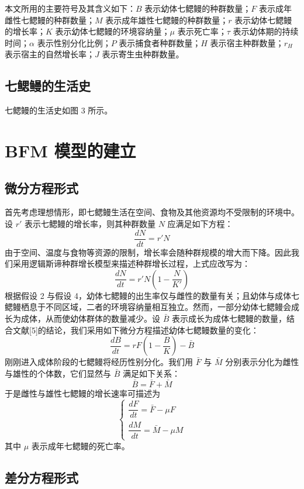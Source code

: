\documentclass[11pt,a4paper]{ctexart}
\begin{document}
本文所用的主要符号及其含义如下：$B$ 表示幼体七鳃鳗的种群数量；$F$ 表示成年雌性七鳃鳗的种群数量；$M$ 表示成年雄性七鳃鳗的种群数量；$r$ 表示幼体七鳃鳗的增长率；$K$ 表示幼体七鳃鳗的环境容纳量；$\mu$ 表示死亡率；$\tau$ 表示幼体期的持续时间；$\alpha$ 表示性别分化比例；$P$ 表示捕食者种群数量；$H$ 表示宿主种群数量；$r_H$ 表示宿主的自然增长率；$J$ 表示寄生虫种群数量。

\subsection{七鳃鳗的生活史}

七鳃鳗的生活史如图 3 所示。

\section{BFM 模型的建立}

\subsection{微分方程形式}

首先考虑理想情形，即七鳃鳗生活在空间、食物及其他资源均不受限制的环境中。设 $r'$ 表示七鳃鳗的增长率，则其种群数量 $N$ 应满足如下方程：
\[
\frac{dN}{dt}=r'N
\]
由于空间、温度与食物等资源的限制，增长率会随种群规模的增大而下降。因此我们采用逻辑斯谛种群增长模型来描述种群增长过程，上式应改写为：
\[
\frac{dN}{dt}=r'N\left(1-\frac{N}{K'}\right)
\]
根据假设 2 与假设 4，幼体七鳃鳗的出生率仅与雌性的数量有关；且幼体与成体七鳃鳗栖息于不同区域，二者的环境容纳量相互独立。然而，一部分幼体七鳃鳗会成长为成体，从而使幼体群体的数量减少。设 $\bar B$ 表示成长为成体七鳃鳗的数量，结合文献[5]的结论，我们采用如下微分方程描述幼体七鳃鳗数量的变化：
\[
\frac{dB}{dt}=rF\left(1-\frac{B}{K}\right)-\bar B
\]
刚刚进入成体阶段的七鳃鳗将经历性别分化。我们用 $\bar F$ 与 $\bar M$ 分别表示分化为雌性与雄性的个体数，它们显然与 $\bar B$ 满足如下关系：
\begin{equation}
\bar B=\bar F+\bar M \tag{1}
\end{equation}
于是雌性与雄性七鳃鳗的增长速率可描述为
\[
\begin{cases}
\dfrac{dF}{dt}=\bar F-\mu F\\[0.5em]
\dfrac{dM}{dt}=\bar M-\mu M
\end{cases}
\]
其中 $\mu$ 表示成年七鳃鳗的死亡率。

\subsection{差分方程形式}
\end{document}

